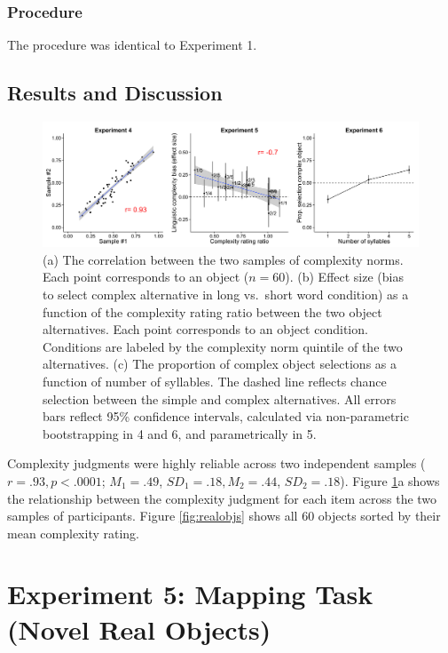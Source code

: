 \documentclass[man]{apa2}
\begin{document}
\subsubsection{Procedure} The procedure was identical to Experiment 1.

\subsection{Results and Discussion}

 \begin{figure} [t]
 \begin{center} 
  \includegraphics[width=6in]{figures/study2_plots.png} 
  \caption{\label{fig:study2_plots} (a) The correlation between the two samples of complexity norms. Each point corresponds to an object ($n = 60$). (b) Effect size (bias to select complex alternative in long vs.\ short word condition) as a function of the complexity rating ratio between the two object alternatives. Each point corresponds to an object condition. Conditions are labeled by the complexity norm quintile of the two alternatives. (c) The proportion of complex object selections as a function of number of syllables. The dashed line reflects chance selection between the simple and complex alternatives. All errors bars reflect 95\% confidence intervals, calculated via non-parametric bootstrapping in 4 and 6, and parametrically in 5.} 
 \end{center} 
\end{figure}	
 Complexity judgments were highly reliable across two independent samples ($r = .93, p < .0001$; $M_1 = .49$, $SD_1 = .18, M_2 = .44$, $SD_2 = .18$). Figure \ref{fig:study2_plots}a shows the relationship between the complexity judgment for each item across the two samples of participants. Figure \ref{fig:realobjs} shows all 60 objects sorted by their mean complexity rating.

\section{Experiment 5: Mapping Task (Novel Real Objects)}
\end{document}
